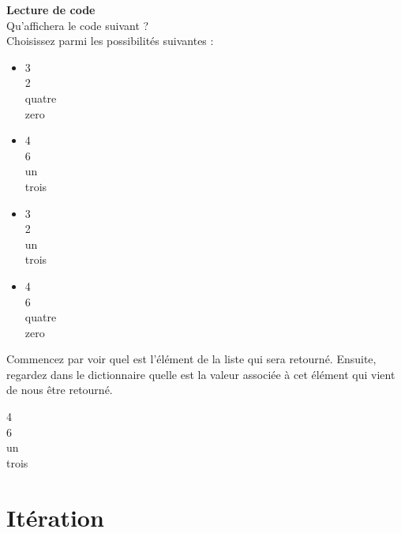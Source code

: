     \begin{Exercice}[15 minutes] \textbf{Lecture de code}\\
      	Qu'affichera le code suivant ? \\
      	
      	
      	
      	Choisissez parmi les possibilités suivantes :
      	
      	\begin{itemize}
      	\item 3 \\
      	2 \\
      	quatre \\
      	zero\\
      	\item 4 \\
      	6 \\
      	un \\
      	trois\\
      	\item 3 \\
      	2 \\
      	un \\
      	trois\\
      	\item 4 \\
      	6 \\
      	quatre \\
      	zero \\
      	\end{itemize}
    
        \begin{conseil}
           Commencez par voir quel est l'élément de la liste qui sera retourné. Ensuite, regardez dans le dictionnaire quelle est la valeur associée à cet élément qui vient de nous être retourné.		     
        \end{conseil}
        
        \begin{solution}
        4 \\
      	6 \\
      	un \\
      	trois
        \end{solution}
    \end{Exercice}
    
    \section{Itération}
    
